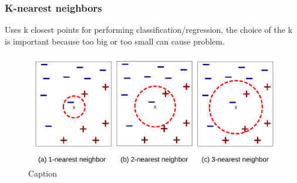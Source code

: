 \subsubsection{K-nearest neighbors}
 Uses k closest points for performing classification/regression, the choice of the k is important because too big or too small can cause problem.
 \begin{figure}[H]
     \centering
     \includegraphics[scale=0.5]{images/GB/GB5.png}
     \caption{Caption}
     \label{fig:enter-label}
 \end{figure}
